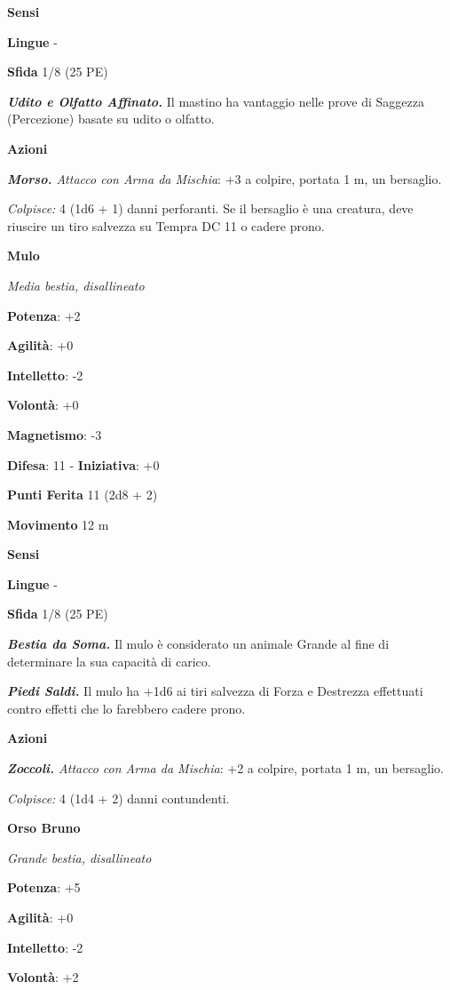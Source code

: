 \begin{multicols}{2}
\textbf{Sensi} 

\textbf{Lingue} -

\textbf{Sfida} 1/8 (25 PE)\smallskip

\emph{\textbf{Udito e Olfatto Affinato.}} Il mastino ha vantaggio nelle
prove di Saggezza (Percezione) basate su udito o olfatto.

\smallskip\textbf{Azioni}

\emph{\textbf{Morso.} Attacco con Arma da Mischia}: +3 a colpire,
portata 1 m, un bersaglio.

\emph{Colpisce:} 4 (1d6 + 1) danni perforanti. Se il bersaglio è una
creatura, deve riuscire un tiro salvezza su Tempra DC 11 o cadere prono.

\textbf{Mulo}

\emph{Media bestia, disallineato}

\textbf{Potenza}: +2

\textbf{Agilità}: +0

\textbf{Intelletto}: -2

\textbf{Volontà}: +0

\textbf{Magnetismo}: -3

\textbf{Difesa}: 11 - \textbf{Iniziativa}: +0

\textbf{Punti Ferita} 11 (2d8 + 2)

\textbf{Movimento} 12 m

\textbf{Sensi} 

\textbf{Lingue} -

\textbf{Sfida} 1/8 (25 PE)\smallskip

\emph{\textbf{Bestia da Soma.}} Il mulo è considerato un animale Grande
al fine di determinare la sua capacità di carico.

\emph{\textbf{Piedi Saldi.}} Il mulo ha +1d6 ai tiri salvezza di
Forza e Destrezza effettuati contro effetti che lo farebbero cadere
prono.

\smallskip\textbf{Azioni}

\emph{\textbf{Zoccoli.} Attacco con Arma da Mischia}: +2 a colpire,
portata 1 m, un bersaglio.

\emph{Colpisce:} 4 (1d4 + 2) danni contundenti.

\textbf{Orso Bruno}

\emph{Grande bestia, disallineato}

\textbf{Potenza}: +5

\textbf{Agilità}: +0

\textbf{Intelletto}: -2

\textbf{Volontà}: +2


\end{multicols}
